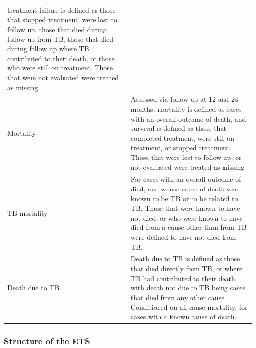 \documentclass[11pt,twoside]{bristolthesis}
\begin{document}
\begin{longtable}[]{@{}ll@{}}
\begin{minipage}[t]{0.62\columnwidth}
  treatment failure is defined as those that stopped
  treatment, were lost to follow up, those that died
  during follow up from TB, those that died during
  follow up where TB contributed to their death, or
  those who were still on treatment. Those that were
  not evaluated were treated as missing.\strut
  \end{minipage}\tabularnewline
  \begin{minipage}[t]{0.33\columnwidth}\raggedright
  Mortality\strut
  \end{minipage} & \begin{minipage}[t]{0.62\columnwidth}\raggedright
  Assessed via follow up at 12 and 24 months:
  mortality is defined as cases with an overall
  outcome of death, and survival is defined as those
  that completed treatment, were still on treatment,
  or stopped treatment. Those that were lost to
  follow up, or not evaluated were treated as
  missing\strut
  \end{minipage}\tabularnewline
  \begin{minipage}[t]{0.33\columnwidth}\raggedright
  TB mortality\strut
  \end{minipage} & \begin{minipage}[t]{0.62\columnwidth}\raggedright
  For cases with an overall outcome of died, and
  whose cause of death was known to be TB or to be
  related to TB. Those that were known to have not
  died, or who were known to have died from a cause
  other than from TB were defined to have not died
  from TB.\strut
  \end{minipage}\tabularnewline
  \begin{minipage}[t]{0.33\columnwidth}\raggedright
  Death due to TB\strut
  \end{minipage} & \begin{minipage}[t]{0.62\columnwidth}\raggedright
  Death due to TB is defined as those that died
  directly from TB, or where TB had contributed to
  their death with death not due to TB being cases
  that died from any other cause. Conditioned on
  all-cause mortality, for cases with a known cause
  of death.\strut
  \end{minipage}\tabularnewline
  \bottomrule
  \end{longtable}
  \hypertarget{structure-of-the-ets}{%
  \subsubsection{Structure of the ETS}\label{structure-of-the-ets}}
  
\end{document}
